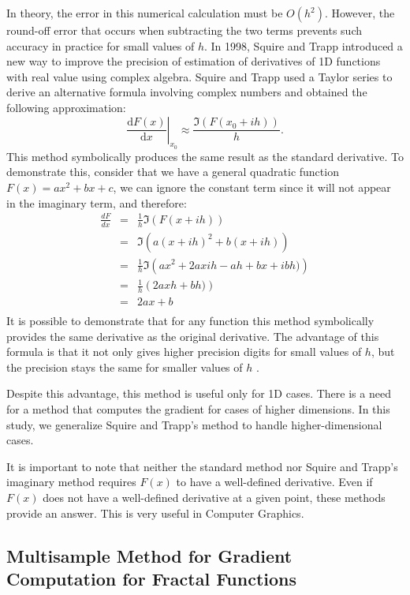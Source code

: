 \documentclass{article}
\begin{document}
In theory, the error in this numerical calculation must be $O(h^2)$. However, the round-off error that occurs when subtracting the two terms prevents such accuracy in practice for small values of $h$. In 1998, Squire and Trapp \cite{squire1998} introduced a new way to improve the precision of estimation of derivatives of 1D functions with real value using complex algebra.  Squire and Trapp used a Taylor series to derive an alternative formula involving complex numbers and obtained the following approximation:
$$\left. \frac{\mathrm{d}F(x)}{\mathrm{d}x} \right|_{x_0} \approx \frac{ \Im ( F (x_0 + i h ))}{h} . $$
This method symbolically produces the same result as the standard derivative. To demonstrate this, consider that we have a general quadratic function $F(x) = a x^2+ bx + c$, we can ignore the constant term since it will not appear in the imaginary term, and therefore: 
\begin{eqnarray} 
\frac{dF}{dx} &=&\frac{1}{h} \Im \left( F(x+ih) \right)  \nonumber \\ 
&=& \Im \left( a (x+ih)^2 + b(x+ih) \right) \nonumber \\
&=& \frac{1}{h} \Im \left( a x^2+ 2 a x i h - a h + b x + i b h) \right) \nonumber \\ 
&=& \frac{1}{h} \left( 2 a x  h +  b h) \right) \nonumber \\ 
&=&  2 a x   +  b \nonumber \\ 
\end{eqnarray}
It is possible to demonstrate that for any function this method symbolically provides the same derivative as the original derivative. The advantage of this formula is that it not only gives higher precision digits for small values of $h$, but the precision stays the same for smaller values of $h$ \cite{greenwell1998}. 

Despite this advantage, this method is useful only for 1D cases. There is a need for a method that computes the gradient for cases of higher dimensions.  In this study, we generalize Squire and Trapp's method to handle higher-dimensional cases.

It is important to note that neither the standard method nor Squire and Trapp's imaginary method requires $F(x)$ to have a well-defined derivative. Even if $F(x)$ does not have a well-defined derivative at a given point, these methods provide an answer. This is very useful in Computer Graphics. 

\subsection{Multisample Method for Gradient Computation for Fractal Functions}
\label{sec_hart}
\end{document}

